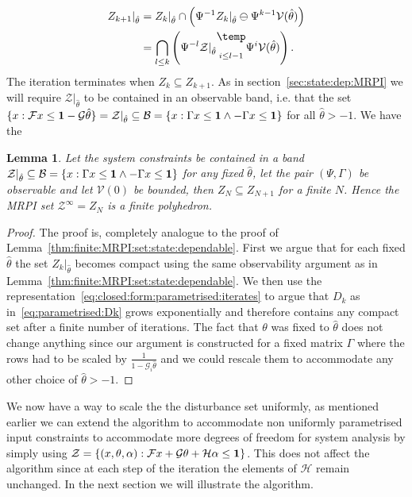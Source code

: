 \documentclass[letterpaper, 10pt, conference]{ieeeconf} %
\newtheorem{thm}{Lemma}[section]
\newcommand{\bigominus}{\raisebox{10pt}{$\temp$}}
\begin{document}
%
\begin{equation}\label{eq:closed:form:parametrised:iterates}
\begin{split}
	Z_{k+1}\vert_{\hat\theta} &= Z_{k}\vert_{\hat\theta}\cap\left(
	\Psi^{-1}Z_k\vert_{\hat\theta}\ominus\Psi^{k-1}\mathcal V(\hat\theta)\right)\\
	&=\bigcap_{l\leq k}\left(\Psi^{-l}\mathcal Z\vert_{\hat\theta}\underset{i\leq l-1}{\bigominus} 
	\Psi^i \mathcal V(\hat\theta)
	\right).
\end{split}
\end{equation}
%
The iteration terminates when $Z_k\subseteq Z_{k+1}$. As in section~\ref{sec:state:dep:MRPI}
we will require $\mathcal Z\vert_{\hat\theta}$ to be contained in an observable band, i.e. that 
the set $\{x:\mathcal Fx \leq {\bf{1}}-\mathcal G\hat\theta\}=\mathcal Z\vert_{\hat\theta}\subseteq
\mathcal B=\{x:\Gamma x\leq {\bf{1}}\wedge -\Gamma x\leq {\bf{1}}\}$ for all $\hat\theta>-1$. We have the
%
\begin{thm}
Let the system constraints be contained in a band $\mathcal Z\vert_{\hat\theta}\subseteq\mathcal 
B=\{x:\Gamma x\leq {\bf{1}}\wedge -\Gamma x\leq {\bf{1}}\}$ for any fixed $\hat\theta$, let the
pair $(\Psi,\Gamma)$ be observable and let $\mathcal V(0)$ be bounded, then $Z_N\subseteq Z_{N+1}$
for a finite $N$. Hence the MRPI set $\mathcal Z^\infty = Z_N$ is a finite polyhedron.
\end{thm}
%
\begin{proof}
The proof is, completely analogue to the proof of Lemma~\ref{thm:finite:MRPI:set:state:dependable}.
First we argue that for each fixed $\hat\theta$ the set $Z_k\vert_{\hat\theta}$ becomes compact using the same
observability argument as in Lemma~\ref{thm:finite:MRPI:set:state:dependable}.
We then use the representation~\eqref{eq:closed:form:parametrised:iterates} to argue that $D_k$ as
in~\eqref{eq:parametrised:Dk} grows exponentially and therefore contains any compact set after a finite number
of iterations. The fact that $\theta$ was fixed to $\hat\theta$ does not change anything since
our argument is constructed for a fixed matrix $\Gamma$ where the rows had to be scaled by 
$\frac{1}{1-\mathcal G_i\hat\theta}$ and we could rescale them to accommodate any other choice of $\hat\theta>-1$.
\end{proof}
We now have a way to scale the the disturbance set uniformly, as mentioned earlier we can extend the algorithm
to accommodate non uniformly parametrised input constraints to accommodate more degrees of freedom for 
system analysis by simply using $\mathcal Z = \{(x,\theta,\alpha): \mathcal F x + \mathcal G\theta + 
\mathcal H \alpha \leq {\bf{1}}\}$. This does not affect the algorithm since at each step of the iteration 
the elements of $\mathcal H$ remain unchanged. In the next section we will illustrate the algorithm.
%
%
%
%
%
%
\end{document}

